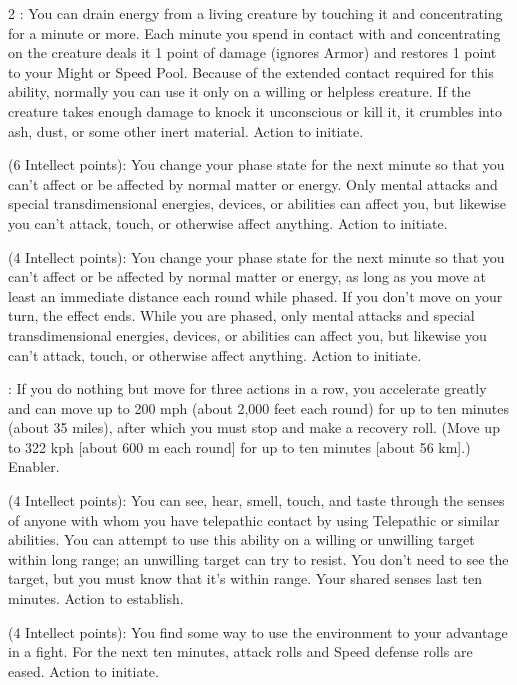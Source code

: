 \begin{multicols}{2}
: You can drain energy from a living creature by touching it and concentrating for a minute or more. Each minute you spend in contact with and concentrating on the creature deals it 1 point of damage (ignores Armor) and restores 1 point to your Might or Speed Pool. Because of the extended contact required for this ability, normally you can use it only on a willing or helpless creature. If the creature takes enough damage to knock it unconscious or kill it, it crumbles into ash, dust, or some other inert material. Action to initiate. 
 
 (6 Intellect points): You change your phase state for the next minute so that you can’t affect or be affected by normal matter or energy. Only mental attacks and special transdimensional energies, devices, or abilities can affect you, but likewise you can’t attack, touch, or otherwise affect anything. Action to initiate. 
 
 (4 Intellect points): You change your phase state for the next minute so that you can’t affect or be affected by normal matter or energy, as long as you move at least an immediate distance each round while phased. If you don’t move on your turn, the effect ends. While you are phased, only mental attacks and special transdimensional energies, devices, or abilities can affect you, but likewise you can’t attack, touch, or otherwise affect anything. Action to initiate. 
 
: If you do nothing but move for three actions in a row, you accelerate greatly and can move up to 200 mph (about 2,000 feet each round) for up to ten minutes (about 35 miles), after which you must stop and make a recovery roll. (Move up to 322 kph [about 600 m each round] for up to ten minutes [about 56 km].) Enabler. 
 
 (4 Intellect points): You can see, hear, smell, touch, and taste through the senses of anyone with whom you have telepathic contact by using Telepathic or similar abilities. You can attempt to use this ability on a willing or unwilling target within long range; an unwilling target can try to resist. You don’t need to see the target, but you must know that it’s within range. Your shared senses last ten minutes. Action to establish. 
 
 (4 Intellect points): You find some way to use the environment to your advantage in a fight. For the next ten minutes, attack rolls and Speed defense rolls are eased. Action to initiate. 
 

\end{multicols}
